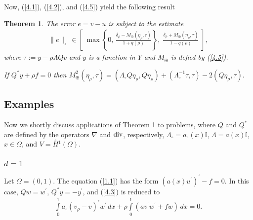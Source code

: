 \documentclass[amstex,amstext,amsfonts,epsf,12pt] {amsart}
\newtheorem{theorem}{Theorem}[section]
\newcommand\be{\begin{eqnarray*}}
\newcommand\ee{\end{eqnarray*}}
\newcommand\ben{\begin{eqnarray}}
\newcommand\een{\end{eqnarray}}
\def\be{\begin{eqnarray*}}
\def\ee{\end{eqnarray*}}
\def\ben{\begin{eqnarray}}
\def\een{\end{eqnarray}}
\def\dvg{{\rm div}}
\def\oH{\stackrel{\circ}{H}{}\!}
\begin{document}
Now, (\ref{4.1}), (\ref{4.2}), and (\ref{4.5}) yield the following result
\begin{theorem}
\label{th2}
The error  $e=v-u$ is subject to the
estimate
\ben
\label{4.6}
\|e\|_\circ\,\in
\left[\;\max\left\{0,\,\frac{\delta_\rho-M_\oplus(\eta_\rho,\tau)}{1+q(\rho)}\right\},\;\frac{\delta_\rho+
M_\oplus(\eta_\rho,\tau)}{1-q(\rho)}\;
\right],
\een
where  $\tau:=y-\rho \Lambda Q v $ and $y$ is a function in $Y$
and $M_\oplus$ is defied by (\ref{4.5}).

If $Q^*y+\rho f=0$ then
$
M^2_\oplus(\eta_\rho,\tau)=
 (\Lambda_\circ Q \eta_\rho, Q \eta_\rho)+
(\Lambda_\circ^{-1}\tau, \tau)-2(Q\eta_\rho,\tau ).
$
\end{theorem}

\subsection{Examples}
Now we shortly discuss applications of  Theorem \ref{th2}
to problems, where $Q$ and $Q^*$ are defined by the operators
$\nabla$ and $\dvg$, respectively, $\Lambda_\circ=a_\circ(x){\mathbb I}$,
$\Lambda=a(x){\mathbb I}$, $x\in \Omega$, and $V=\oH^1(\Omega)$.








\subsubsection{$d=1$}
Let $\Omega=(0,1)$. The equation (\ref{1.1}) 
has the form $(a(x) u^\prime)^\prime-f=0$. 
In this case,  $Qw=w^\prime$,  $Q^*y=-y^\prime$, and (\ref{4.3}) is reduced to
\ben
\label{4.7}
\int\limits^1_0 a_\circ (v_\rho-v)^\prime w^\prime\,dx+\rho\int\limits^1_0(a v^\prime w^\prime+fw)\,dx=0.
\een
\end{document}
